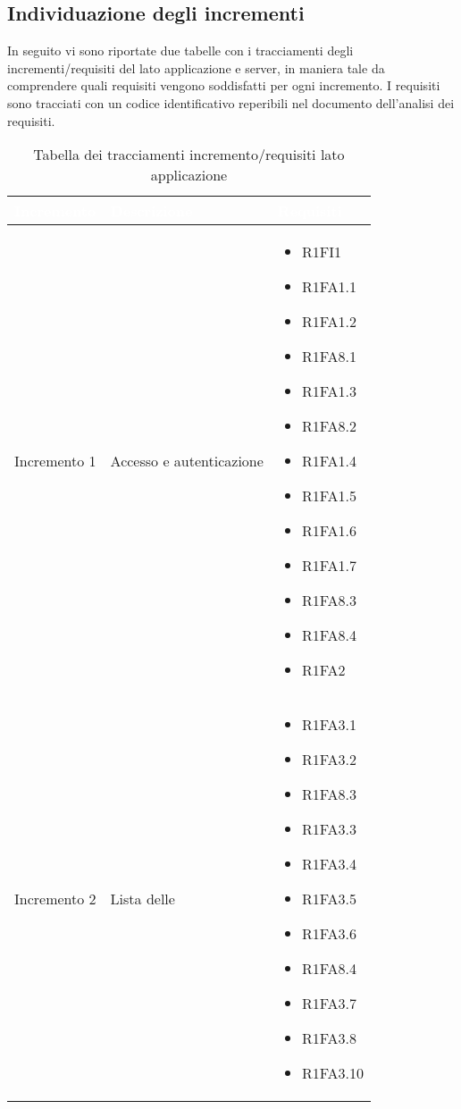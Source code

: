 \subsection{Individuazione degli incrementi}
In seguito vi sono riportate due tabelle con i tracciamenti degli incrementi/requisiti del lato applicazione e server, in maniera tale da comprendere quali requisiti vengono soddisfatti per ogni incremento.
I requisiti sono tracciati con un codice identificativo reperibili nel documento dell'analisi dei requisiti.

{
\renewcommand{\arraystretch}{2}
\centering
	
\begin{longtable}{C{4cm} C{6cm} C{4cm}}
\caption{Tabella dei tracciamenti incremento/requisiti lato applicazione}\\

\textcolor{white}{\textbf{Incremento}} &
\textcolor{white}{\textbf{Descrizione}} & 
\textcolor{white}{\textbf{Requisiti}}\\
\endhead

Incremento 1 & Accesso e autenticazione & \begin{itemize}
    \item[ ] R1FI1
    \item[ ] R1FA1.1
    \item[ ] R1FA1.2
    \item[ ] R1FA8.1
    \item[ ] R1FA1.3
    \item[ ] R1FA8.2
    \item[ ] R1FA1.4
    \item[ ] R1FA1.5
    \item[ ] R1FA1.6
    \item[ ] R1FA1.7
    \item[ ] R1FA8.3
    \item[ ] R1FA8.4
    \item[ ] R1FA2
\end{itemize}\\

Incremento 2 & Lista delle  & \begin{itemize}
    \item[ ] R1FA3.1
    \item[ ] R1FA3.2
    \item[ ] R1FA8.3
    \item[ ] R1FA3.3
    \item[ ] R1FA3.4
    \item[ ] R1FA3.5
    \item[ ] R1FA3.6
    \item[ ] R1FA8.4
    \item[ ] R1FA3.7
    \item[ ] R1FA3.8
    \item[ ] R1FA3.10
\end{itemize}\\


\end{longtable}}
